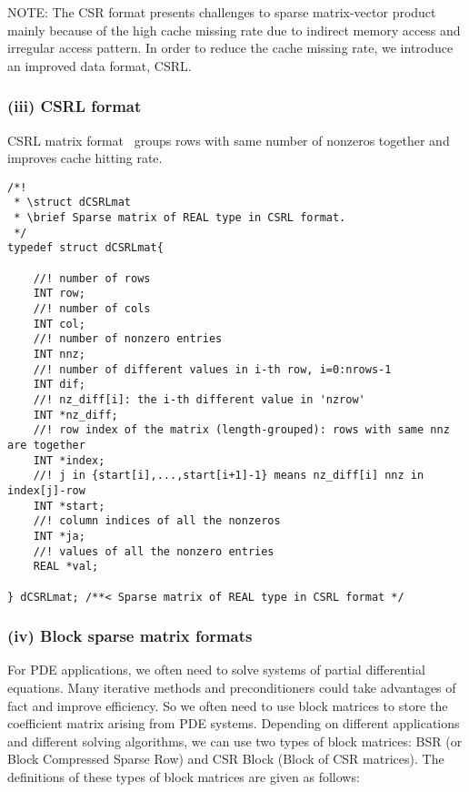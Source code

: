 \documentclass[11pt]{memoir}
\begin{document}
\begin{snugshade}\noindent
NOTE: The CSR format presents challenges to sparse matrix-vector product mainly because of the high cache missing rate due to indirect memory access and irregular access pattern. In order to reduce the cache missing rate, we introduce an improved data format, CSRL.
\end{snugshade}

\subsubsection*{(iii) CSRL format}

CSRL matrix format~\cite{Mellor-crummey2004} groups rows with same number of nonzeros together and improves cache hitting rate.
\begin{lstlisting}
/*!
 * \struct dCSRLmat
 * \brief Sparse matrix of REAL type in CSRL format.
 */
typedef struct dCSRLmat{

	//! number of rows	
	INT row;
	//! number of cols
	INT col;
	//! number of nonzero entries
	INT nnz;
	//! number of different values in i-th row, i=0:nrows-1
	INT dif;
	//! nz_diff[i]: the i-th different value in 'nzrow'
	INT *nz_diff;
	//! row index of the matrix (length-grouped): rows with same nnz are together
	INT *index;
	//! j in {start[i],...,start[i+1]-1} means nz_diff[i] nnz in index[j]-row	
	INT *start;
	//! column indices of all the nonzeros
	INT *ja;
	//! values of all the nonzero entries
	REAL *val;

} dCSRLmat; /**< Sparse matrix of REAL type in CSRL format */
\end{lstlisting}

\subsubsection*{(iv) Block sparse matrix formats}

For PDE applications, we often need to solve systems of partial differential equations. Many iterative methods and preconditioners could take advantages of fact and improve efficiency. So we often need to use block matrices to store the coefficient matrix arising from PDE systems. Depending on different applications and different solving algorithms, we can use two types of block matrices: BSR (or Block Compressed Sparse Row) and CSR Block (Block of CSR matrices). The definitions of these types of block matrices are given as follows:
\end{document}
